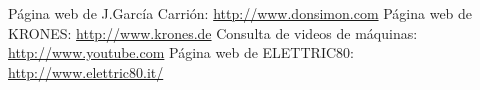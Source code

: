 \documentclass[11pt,a4paper,spanish,twoside]{report}
\begin{document}
\begin{thebibliography}{99}
 Página web de J.García Carrión: \url{http://www.donsimon.com}
 Página web de KRONES: \url{http://www.krones.de}
 Consulta de videos de máquinas:
  \url{http://www.youtube.com}
 Página web de ELETTRIC80:  \url{http://www.elettric80.it/}
\end{thebibliography}
\end{document}
